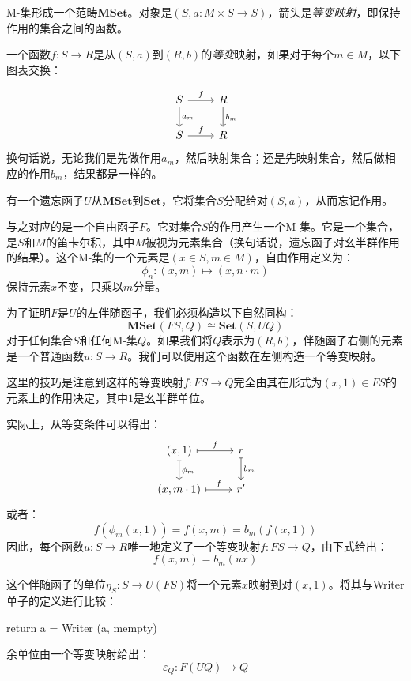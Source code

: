 \documentclass[DaoFP]{subfiles}
\begin{document}
M-集形成一个范畴$\mathbf{MSet}$。对象是$(S, a\colon M\times S \to S)$，箭头是\emph{等变映射}，即保持作用的集合之间的函数。

一个函数$f \colon S \to R$是从$(S, a)$到$(R, b)$的\emph{等变}映射，如果对于每个$m \in M$，以下图表交换：

\[
 \begin{tikzcd}
 S 
 \arrow[r, "f"]
 \arrow[d, "a_m"]
 & R
\arrow[d, "b_m"]
 \\
S
 \arrow[r, "f"]
 & R
  \end{tikzcd}
\]
换句话说，无论我们是先做作用$a_m$，然后映射集合；还是先映射集合，然后做相应的作用$b_m$，结果都是一样的。

有一个遗忘函子$U$从$\mathbf{MSet}$到$\mathbf{Set}$，它将集合$S$分配给对$(S, a)$，从而忘记作用。

与之对应的是一个自由函子$F$。它对集合$S$的作用产生一个M-集。它是一个集合，是$S$和$M$的笛卡尔积，其中$M$被视为元素集合（换句话说，遗忘函子对幺半群作用的结果）。这个M-集的一个元素是$(x \in S, m \in M)$，自由作用定义为：
\[ \phi_n \colon (x, m) \mapsto (x, n \cdot m) \]
保持元素$x$不变，只乘以$m$分量。

为了证明$F$是$U$的左伴随函子，我们必须构造以下自然同构：
\[ \mathbf{MSet}( F S, Q) \cong \mathbf{Set}(S, U Q) \]
对于任何集合$S$和任何M-集$Q$。如果我们将$Q$表示为$(R, b)$，伴随函子右侧的元素是一个普通函数$u \colon S \to R$。我们可以使用这个函数在左侧构造一个等变映射。

这里的技巧是注意到这样的等变映射$f \colon F S \to Q$完全由其在形式为$(x, 1) \in F S$的元素上的作用决定，其中$1$是幺半群单位。

实际上，从等变条件可以得出：
\[
 \begin{tikzcd}
 (x, 1)
 \arrow[r, mapsto, "f"]
 \arrow[d, mapsto, "\phi_m"]
 & r
\arrow[d, mapsto, "b_m"]
 \\
(x, m \cdot 1)
 \arrow[r, mapsto, "f"]
 & r'
  \end{tikzcd}
\]
或者：
\[ f( \phi_m (x, 1)) = f (x, m) = b_m ( f (x, 1)) \]
因此，每个函数$u \colon S \to R$唯一地定义了一个等变映射$f \colon F S \to Q$，由下式给出：
\[ f (x, m) = b_m (u x) \]

这个伴随函子的单位$\eta_S \colon S \to U (F S)$将一个元素$x$映射到对$(x, 1)$。将其与Writer单子的定义进行比较：
\begin{haskell}
return a = Writer (a, mempty)
\end{haskell}

余单位由一个等变映射给出：
\[ \varepsilon_Q \colon F (U Q) \to Q \]
\end{document}

